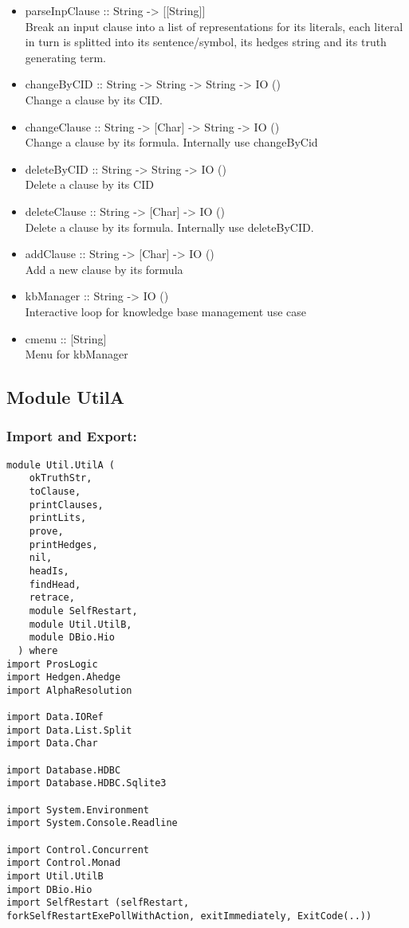 \documentclass[../gr-final.tex]{subfiles}
\begin{document}
\begin{itemize}
        \item parseInpClause :: String -> [[String]]\\
                Break an input clause into a list of
                representations for its literals, each literal
                in turn is splitted into its sentence/symbol, its
                hedges string and its truth generating term.
        \item changeByCID :: String -> String -> String -> IO
                ()\\
                Change a clause by its CID.
        \item changeClause :: String -> [Char] -> String -> IO
                ()\\
                Change a clause by its formula. Internally use
                changeByCid
        \item deleteByCID :: String -> String -> IO ()\\
                Delete a clause by its CID
        \item deleteClause :: String -> [Char] -> IO ()\\
                Delete a clause by its formula. Internally use
                deleteByCID.
        \item addClause :: String -> [Char] -> IO ()\\
                Add a new clause by its formula
        \item kbManager :: String -> IO ()\\
                Interactive loop for knowledge base management
                use case
        \item cmenu :: [String] \\
                Menu for kbManager

\end{itemize}
\subsection{Module UtilA}
\subsubsection{Import and Export:}
\begin{lstlisting}
module Util.UtilA (
    okTruthStr,
    toClause,
    printClauses,
    printLits,
    prove,
    printHedges,    
    nil,
    headIs,
    findHead,
    retrace,
    module SelfRestart,
    module Util.UtilB, 
    module DBio.Hio
  ) where
import ProsLogic
import Hedgen.Ahedge
import AlphaResolution

import Data.IORef
import Data.List.Split
import Data.Char

import Database.HDBC
import Database.HDBC.Sqlite3

import System.Environment
import System.Console.Readline

import Control.Concurrent
import Control.Monad
import Util.UtilB
import DBio.Hio
import SelfRestart (selfRestart,
forkSelfRestartExePollWithAction, exitImmediately, ExitCode(..))

\end{lstlisting}
\end{document}
